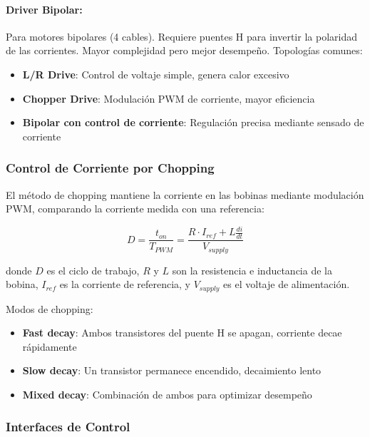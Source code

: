 \paragraph{Driver Bipolar:}

Para motores bipolares (4 cables). Requiere puentes H para invertir la polaridad de las corrientes. Mayor complejidad pero mejor desempeño. Topologías comunes:

\begin{itemize}
    \item \textbf{L/R Drive}: Control de voltaje simple, genera calor excesivo
    \item \textbf{Chopper Drive}: Modulación PWM de corriente, mayor eficiencia
    \item \textbf{Bipolar con control de corriente}: Regulación precisa mediante sensado de corriente
\end{itemize}

\subsubsection{Control de Corriente por Chopping}

El método de chopping mantiene la corriente en las bobinas mediante modulación PWM, comparando la corriente medida con una referencia:

\begin{equation}
D = \frac{t_{on}}{T_{PWM}} = \frac{R \cdot I_{ref} + L \frac{di}{dt}}{V_{supply}}
\end{equation}

donde $D$ es el ciclo de trabajo, $R$ y $L$ son la resistencia e inductancia de la bobina, $I_{ref}$ es la corriente de referencia, y $V_{supply}$ es el voltaje de alimentación.

Modos de chopping:
\begin{itemize}
    \item \textbf{Fast decay}: Ambos transistores del puente H se apagan, corriente decae rápidamente
    \item \textbf{Slow decay}: Un transistor permanece encendido, decaimiento lento
    \item \textbf{Mixed decay}: Combinación de ambos para optimizar desempeño
\end{itemize}

\subsubsection{Interfaces de Control}

